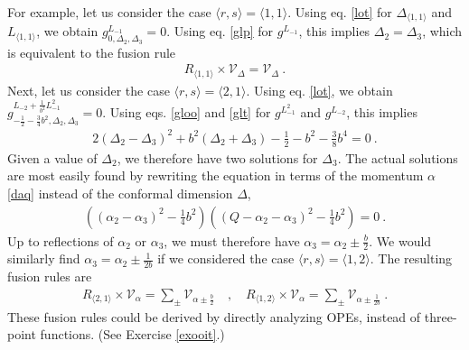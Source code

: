 \documentclass[12pt,a4paper,notitlepage]{report}
\numberwithin{equation}{section}
\theoremstyle{break}
\begin{document}
For example, let us consider the case $\langle r,s \rangle = \langle 1,1 \rangle$.
Using eq. \eqref{lot} for $\Delta_{\langle 1,1 \rangle}$ and $L_{\langle 1,1 \rangle}$, we obtain
$g^{L_{-1}}_{0,\Delta_2,\Delta_3} = 0$.
Using eq. \eqref{glp} for $g^{L_{-1}}$, this implies 
$
 \Delta_2=\Delta_3
$,
which is equivalent to the fusion rule
\begin{align}
 \boxed{R_{\langle 1,1\rangle} \times \mathcal{V}_\Delta = \mathcal{V}_\Delta} \ .
\end{align}
Next, let us consider the case $\langle r,s \rangle = \langle 2,1 \rangle$.
Using eq. \eqref{lot}, we obtain 
$g^{L_{-2} +\frac{1}{b^2} L_{-1}^2 }_{-\frac12 -\frac34 b^2,\Delta_2,\Delta_3} = 0$.
Using eqs. \eqref{gloo} and \eqref{glt} for $g^{L_{-1}^2}$ and $g^{L_{-2}}$, this implies
\begin{align}
 2(\Delta_2-\Delta_3)^2 + b^2 (\Delta_2+\Delta_3) - \frac12 - b^2 -\frac38 b^4= 0\ .
\end{align}
Given a value of $\Delta_2$, we therefore have two solutions for $\Delta_3$.
The actual solutions are most easily found by rewriting the equation in terms of the momentum $\alpha$ \eqref{daq} instead of the conformal dimension $\Delta$,
\begin{align}
 \left((\alpha_2-\alpha_3)^2 -\frac14 b^2\right)\left((Q-\alpha_2-\alpha_3)^2 -\frac14 b^2\right) = 0\ .
\end{align}
Up to reflections of $\alpha_2$ or $\alpha_3$, we must therefore have
$
 \alpha_3 = \alpha_2 \pm \frac{b}{2}
$.
We would similarly find $\alpha_3 = \alpha_2 \pm \frac{1}{2b}$ if we considered the case $\langle r,s\rangle = \langle 1,2\rangle$. 
The resulting fusion rules are 
\begin{align}
\boxed{ R_{\langle 2,1 \rangle}\times \mathcal{V}_\alpha = \sum_\pm \mathcal{V}_{\alpha \pm \frac{b}{2}} }\quad , \quad 
\boxed{ R_{\langle 1,2 \rangle}\times \mathcal{V}_\alpha = \sum_\pm \mathcal{V}_{\alpha \pm \frac{1}{2b}} }\ .
\label{rot}
\end{align}
These fusion rules could be derived by directly analyzing OPEs, instead of three-point functions. (See Exercise \ref{exooit}.) 
\end{document}
